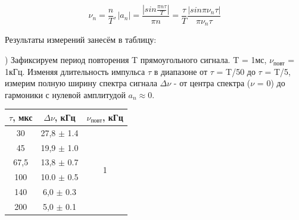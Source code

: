 \documentclass[a4paper,12pt]{article}
\begin{document}
$$ \nu_n = \frac{n}{T},     |a_n| = \frac{|sin\frac{\pi n\tau}{T}|}{\pi n} = \frac{\tau}{T}\frac{|sin\pi\nu_n\tau|}{\pi\nu_n\tau} $$

Результаты измерений занесём в таблицу: 

\begin{center}
\end{center}

) Зафиксируем период повторения T прямоугольного сигнала. T = 1мс, $\nu_{\text{повт}}$ = 1кГц. Изменяя длительность импульса $\tau$ в диапазоне от $\tau$ = T/50 до $\tau$ = T/5, измерим полную ширину спектра сигнала $\Delta\nu$ - от центра спектра ($\nu$ = 0) до гармоники с нулевой амплитудой $a_n\approx 0$.


\begin{center}
\begin{tabular}{|c|c|c|}
	\hline
	$\tau$, мкс & $\Delta\nu$, кГц & $\nu_{\text{повт}}$, кГц \\
	\hline
	30 & 27,8 $\pm$ 1.4  & \multirow{6}{*}{1}\\
	\cline{1-2} 45 & 19,9 $\pm$ 1.0 & \\
	\cline{1-2} 67,5 & 13,8 $\pm$ 0.7 & \\
	\cline{1-2} 100 & 10.0 $\pm$ 0.5 & \\
	\cline{1-2} 140 & 6,0 $\pm$ 0.3 & \\
	\cline{1-2} 200 & 5,0 $\pm$ 0.1 & \\
	\hline
\end{tabular}
\end{center}
\end{document}
